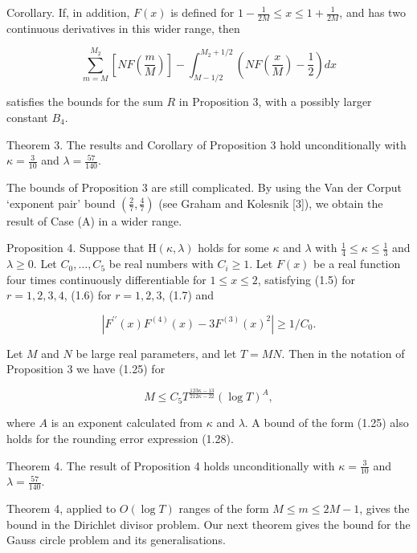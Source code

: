 \documentclass[10pt]{article}
\begin{document}
Corollary. If, in addition, $F(x)$ is defined for $1-\frac{1}{2M} \leqslant x \leqslant 1+\frac{1}{2M}$, and has two continuous derivatives in this wider range, then


\begin{equation*}
\sum_{m=M}^{M_{2}}\left[N F\left(\frac{m}{M}\right)\right]-\int_{M-1 / 2}^{M_{2}+1 / 2}\left(N F\left(\frac{x}{M}\right)-\frac{1}{2}\right) d x \tag{1.28}
\end{equation*}


satisfies the bounds for the sum $R$ in Proposition 3, with a possibly larger constant $B_{4}$.

Theorem 3. The results and Corollary of Proposition 3 hold unconditionally with $\kappa=\frac{3}{10}$ and $\lambda=\frac{57}{140}$.

The bounds of Proposition 3 are still complicated. By using the Van der Corput `exponent pair' bound $\left(\frac{2}{7}, \frac{4}{7}\right)$ (see Graham and Kolesnik [3]), we obtain the result of Case (A) in a wider range.

Proposition 4. Suppose that $\mathrm{H}(\kappa, \lambda)$ holds for some $\kappa$ and $\lambda$ with $\frac{1}{4} \leqslant \kappa \leqslant \frac{1}{3}$ and $\lambda \geqslant 0$. Let $C_{0}, \ldots, C_{5}$ be real numbers with $C_{i} \geqslant 1$. Let $F(x)$ be a real function four times continuously differentiable for $1 \leqslant x \leqslant 2$, satisfying (1.5) for $r=1,2,3,4$, (1.6) for $r=1,2,3$, (1.7) and


\begin{equation*}
\left|F^{\prime \prime}(x) F^{(4)}(x)-3 F^{(3)}(x)^{2}\right| \geqslant 1 / C_{0}. \tag{1.29}
\end{equation*}


Let $M$ and $N$ be large real parameters, and let $T=M N$. Then in the notation of Proposition 3 we have (1.25) for


\begin{equation*}
M \leqslant C_{5} T^{\frac{123 \kappa-13}{212 \kappa-22}}(\log T)^{A}, \tag{1.30}
\end{equation*}


where $A$ is an exponent calculated from $\kappa$ and $\lambda$. A bound of the form (1.25) also holds for the rounding error expression (1.28).

Theorem 4. The result of Proposition 4 holds unconditionally with $\kappa=\frac{3}{10}$ and $\lambda=\frac{57}{140}$.

Theorem 4, applied to $O(\log T)$ ranges of the form $M \leqslant m \leqslant 2 M-1$, gives the bound in the Dirichlet divisor problem. Our next theorem gives the bound for the Gauss circle problem and its generalisations.
\end{document}
